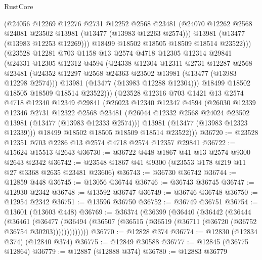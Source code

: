 \begin{lexlean}{RustCore}
\begin{coremodule}
              (@24056
                @12269
                @12276
                @2731
                @12252
                @2568
                @23481
                (@24070 @12262 @2568 @24081 @23502 @13981 (@13477 (@13983 @12263 @2574)))
                @13981
                (@13477 (@13983 @12253 @12269)))
              @18499
              @18502
              @18505
              @18509
              @18514
              @23522)))
        (@23528
          @12281
          @703
          @1158
          @13
          @2574
          @4718
          @12305
          @12314
          @29841
          (@24331
            @12305
            @12312
            @4594
            (@24338
              @12304
              @12311
              @2731
              @12287
              @2568
              @23481
              (@24352 @12297 @2568 @24363 @23502 @13981 (@13477 (@13983 @12298 @2574)))
              @13981
              (@13477 (@13983 @12288 @12304)))
            @18499
            @18502
            @18505
            @18509
            @18514
            @23522)))
      (@23528
        @12316
        @703
        @1421
        @13
        @2574
        @4718
        @12340
        @12349
        @29841
        (@26023
          @12340
          @12347
          @4594
          (@26030
            @12339
            @12346
            @2731
            @12322
            @2568
            @23481
            (@26044 @12332 @2568 @24024 @23502 @13981 (@13477 (@13983 @12333 @2574)))
            @13981
            (@13477 (@13983 @12323 @12339)))
          @18499
          @18502
          @18505
          @18509
          @18514
          @23522)))
@36720 := @23528 @12351 @703 @2286 @13 @2574 @4718 @2574 @12357 @29841
@36722 := @15624 @15513 @2643
@36730 := @36722 @448 @1867 @41 @13 @2574 @9300 @2643 @2342
@36742 := @23548 @1867 @41 @9300 (@23553 @178 @219 @11 @27 @3368 @2635 @23481 @23606)
@36743 := @36730 @36742
@36744 := @12859 @448
@36745 := @13056 @36744
@36746 := @36743 @36745
@36747 := @12930 @2342
@36748 := @13592 @36747
@36749 := @36746 @36748
@36750 := @12954 @2342
@36751 := @13596 @36750
@36752 := @36749 @36751
@36754 := @13601 (@13603 @448)
@36769 := @36374
    (@36399
      (@36440
        (@36442
          (@36444
            (@36461
              (@36477
                (@36494 (@36507 (@36515 (@36519 (@36711 (@36720 (@36752 @36754 @30203)))))))))))))
@36770 := @12828 @374
@36774 := @12830 (@12834 @374) (@12840 @374)
@36775 := @12849 @30588
@36777 := @12845 (@36775 @12864)
@36779 := @12887 (@12888 @374)
@36780 := @12883 @36779

\end{coremodule}
\end{lexlean}
